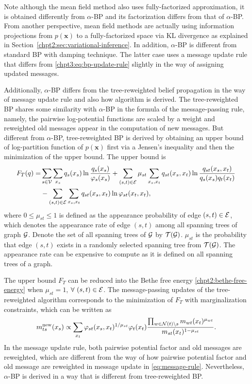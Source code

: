 Note although the mean field method also uses fully-factorized approximation, it is obtained differently from $\alpha$-BP and its factorization differs from that of $\alpha$-BP. From another perspective, mean field methods are actually using information projections from $p(\bm{x})$ to a fully-factorized space via KL divergence as explained in Section~\ref{chpt2:sec:variational-inference}.
In addition, $\alpha$-BP is different from standard BP with damping technique. The latter case uses a message update rule that differs from \eqref{chpt3:eq:bp-update-rule} slightly in the way of assigning updated messages. 


Additionally, $\alpha$-BP differs from the tree-reweighted belief propagation \cite{wainwright2008graphical} in the way of message update rule and also how algorithm is derived. 
The tree-reweighted BP shares some similarity with $\alpha$-BP in the formula of the message-passing rule, namely, the pairwise log-potential functions are scaled by a weight and reweighted old messages appear in the computation of new messages. But different from $\alpha$-BP, tree-reweighted BP is derived by obtaining an upper bound of log-partition function of $p(\bm{x})$ first via a Jensen's inequality and then the minimization of the upper bound. The upper bound is
\begin{align}
  F_T(q) =& \sum_{s\in\mathcal{V}}\sum_{x_s}q_s(x_s) \ln{\frac{q_s(x_s)}{\varphi_s(x_s)}}  + \sum_{(s,t)\in\mathcal{E}}\mu_{st}\sum_{x_s, x_t} q_{st}(x_s, x_t) \ln\frac{q_{st}(x_s,x_t)}{q_s(x_s)q_t(x_t)} \nonumber \\
          & - \sum_{(s,t)\in\mathcal{E}}\sum_{x_s, x_t} q_{st}(x_s, x_t)\ln{\varphi_{st}(x_t, x_t)},
\end{align}
where $0\leq \mu_{st} \leq 1$ is defined as the appearance probability of edge $(s, t) \in \mathcal{E}$, which denotes the appearance rate of edge $(s,t)$ among all spanning trees of graph $\mathcal{G}$. Denote the set of all spanning trees of $\mathcal{G}$ by $\mathcal{T}(\mathcal{G})$. $\mu_{st}$ is the probability that edge $(s,t)$ exists in a randomly selected spanning tree from $\mathcal{T}(\mathcal{G})$. The appearance rate can be expensive to compute as it is defined on all spanning trees of a graph.


The upper bound $F_T$ can be reduced into the Bethe free energy \eqref{chpt2:bethe-free-energy} when $\mu_{st}=1$, $\forall ~(s,t)\in \mathcal{E}$. The message-passing updates of the tree-reweighted algorithm corresponds to the minimization of $F_T$ with marginalization constraints, which can be written as
\begin{align}
  {m}^{\text{new}}_{ts}(x_s) \propto \sum_{x_t} \varphi_{st}(x_s, x_t)^{1/\mu_{st}} {\varphi}_t(x_t) \frac{\prod_{w\in \mathcal{N}(t)\backslash s}m_{wt}(x_t)^{\mu_{wt}} }{m_{st}(x_t)^{1-\mu_{st}}}.
\end{align}
In the message update rule, both pairwise potential factor and old messages are reweighted, which are different from the way of how pairwise potential factor and old message are reweighted in message update in \eqref{eq:message-rule}. Nevertheless, $\alpha$-BP is derived in a way that is different from tree-reweighted BP.


